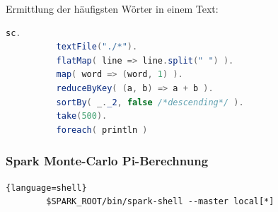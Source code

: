 \begin{frame}
    Ermittlung der häufigsten Wörter in einem Text:

    \begin{lstlisting}[language=java]   % scala
        sc.
          textFile("./*").
          flatMap( line => line.split(" ") ).
          map( word => (word, 1) ).
          reduceByKey( (a, b) => a + b ).
          sortBy( _._2, false /*descending*/ ).
          take(500).
          foreach( println )
    \end{lstlisting}


\end{frame}

\begin{frame}
    \frametitle{Spark Monte-Carlo Pi-Berechnung}
    \begin{lstlisting}{language=shell}
        $SPARK_ROOT/bin/spark-shell --master local[*]
    \end{lstlisting}
\end{frame}


